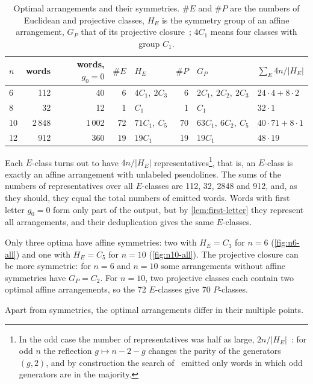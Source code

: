 \begin{table}[tp]
\centering
\small
\setlength{\tabcolsep}{4pt}
\caption{Optimal arrangements and their symmetries. $\#E$ and $\#P$ are the numbers of Euclidean and projective classes, $H_E$ is the symmetry group of an affine arrangement, $G_P$ that of its projective closure~\cite[Definition~5.10]{pu26b}; $4C_1$ means four classes with group $C_1$.}
\label{tab:symmetries}
\begin{tabular}{lrrrlrll}
\toprule
$n$ & words & words, $g_0=0$ & $\#E$ & $H_E$ & $\#P$ & $G_P$ & $\sum_E 4n/|H_E|$ \\
\midrule
6 & 112 & 40 & 6 & $4C_1,\ 2C_3$ & 6 & $2C_1,\ 2C_2,\ 2C_3$ & $24\cdot4+8\cdot2$ \\
8 & 32 & 12 & 1 & $C_1$ & 1 & $C_1$ & $32\cdot1$ \\
10 & 2\,848 & 1\,002 & 72 & $71C_1,\ C_5$ & 70 & $63C_1,\ 6C_2,\ C_5$ & $40\cdot71+8\cdot1$ \\
12 & 912 & 360 & 19 & $19C_1$ & 19 & $19C_1$ & $48\cdot19$ \\
\bottomrule
\end{tabular}
\end{table}

Each $E$-class turns out to have $4n/|H_E|$ representatives\footnote{In the odd case the number of representatives was half as large, $2n/|H_E|$~\cite[Lemma~5.13]{pu26b}: for odd $n$ the reflection $g\mapsto n-2-g$ changes the parity of the generators $(g,2)$, and by construction the search of~\cite[Section~4]{pu26b} emitted only words in which odd generators are in the majority.}, that is, an $E$-class is exactly an affine arrangement with unlabeled pseudolines. The sums of the numbers of representatives over all $E$-classes are 112, 32, 2848 and 912, and, as they should, they equal the total numbers of emitted words.
Words with first letter $g_0=0$ form only part of the output, but by \cref{lem:first-letter} they represent all arrangements, and their deduplication gives the same $E$-classes.

Only three optima have affine symmetries: two with $H_E=C_3$ for $n=6$ (\cref{fig:n6-all}) and one with $H_E=C_5$ for $n=10$ (\cref{fig:n10-all}).
The projective closure can be more symmetric: for $n=6$ and $n=10$ some arrangements without affine symmetries have $G_P=C_2$.
For $n=10$, two projective classes each contain two optimal affine arrangements, so the 72 $E$-classes give 70 $P$-classes.

Apart from symmetries, the optimal arrangements differ in their multiple points.

